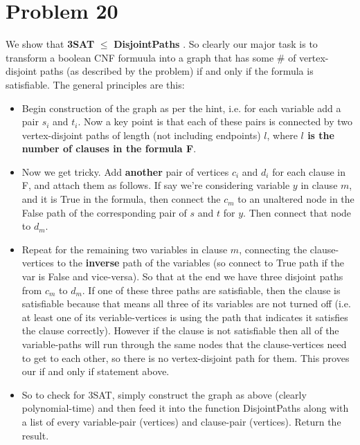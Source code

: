 \documentclass{article}
\providecommand{\prob}[1]{\section*{Problem #1}}
\providecommand{\reducible}[2]{
  \textbf{#1} $\leq$ \textbf{#2}
}
\begin{document}
\prob{20}
We show that \reducible{3SAT}{DisjointPaths}. So clearly our major task is to transform a boolean CNF formuula into a graph that has some \# of vertex-disjoint paths (as described by the problem) if and only if the formula is satisfiable. The general principles are this:
\begin{itemize}
  \item Begin construction of the graph as per the hint, i.e. for each variable add a pair $s_i$ and $t_i$. Now a key point is that each of these pairs is connected by two vertex-disjoint paths of length (not including endpoints) $l$, where \textbf{$l$ is the number of clauses in the formula F}.
  \item Now we get tricky. Add \textbf{another} pair of vertices $c_i$ and $d_i$ for each clause in F, and attach them as follows. If say we're considering variable $y$ in clause $m$, and it is True in the formula, then connect the $c_m$ to an unaltered node in the False path of the corresponding pair of $s$ and $t$ for $y$. Then connect that node to $d_m$.
  \item Repeat for the remaining two variables in clause $m$, connecting the clause-vertices to the \textbf{inverse} path of the variables (so connect to True path if the var is False and vice-versa). So that at the end we have three disjoint paths from $c_m$ to $d_m$. If one of these three paths are satisfiable, then the clause is satisfiable because that means all three of its variables are not turned off (i.e. at least one of its veriable-vertices is using the path that indicates it satisfies the clause correctly). However if the clause is not satisfiable then all of the variable-paths will run through the same nodes that the clause-vertices need to get to each other, so there is no vertex-disjoint path for them. This proves our if and only if statement above.
  \item So to check for 3SAT, simply construct the graph as above (clearly polynomial-time) and then feed it into the function DisjointPaths along with a list of every variable-pair (vertices) and clause-pair (vertices). Return the result.
\end{itemize}
\end{document}
